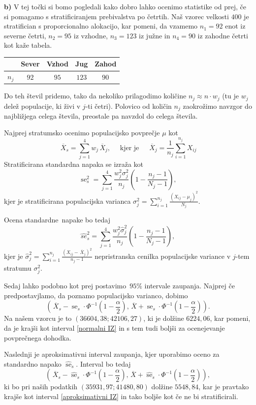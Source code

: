 \documentclass[a4paper,11pt]{article}
\newcommand{\olsi}[1]{\,\overline{\!{#1}}} %
\newcommand{\inv}{^{-1}}
\DeclareMathOperator{\se}{se}
\begin{document}
\noindent
\textbf{b)} V tej točki si bomo pogledali kako dobro lahko ocenimo statistike od prej, če si pomagamo s stratificiranjem prebivalstva po četrtih. Naš vzorec velkosti $400$ je stratifician s proporcionalno alokacijo, kar pomeni, da vzamemo $n_1 = 92$ enot iz severne četrti, $n_2 = 95$ iz vzhodne, $n_3 = 123$ iz južne in $n_4 = 90$ iz zahodne četrti kot kaže tabela.
\begin{center}
\begin{tabular}{|c || c c c c ||}
    \hline
    & Sever & Vzhod & Jug & Zahod \\
    \hline
    $n_j$ & $92$ & $95$ & $123$ & $90$ \\
    \hline 
\end{tabular}
\end{center}
Do teh števil pridemo, tako da nekoliko prilagodimo količine $n_j \approx n \cdot w_j$ (tu je $w_j$ delež populacije, ki živi v $j$-ti četri). Polovico od količin $n_j$ zaokrožimo navzgor do najbližjega celega števila, preostale pa navzdol do celega števila.

Najprej stratumsko ocenimo populacijsko povprečje $\mu$ kot
\[
    \olsi{X}_s = \sum_{j = 1}^4 w_j \olsi{X}_j, \quad \text{ kjer je } \quad \olsi{X}_j = \frac{1}{n_j}\sum_{i = 1}^{n_j} X_{ij}
\]
Stratificirana standardna napaka se izraža kot
\[
    \se^2_s = \sum_{j = 1}^4 \frac{w_j^2 \sigma_j^2}{n_j}\left(1 - \frac{n_j - 1}{N_j - 1}\right), 
\]
kjer je stratificirana populacijska varianca $\sigma_j^2 = \sum_{i = 1}^{n_j} \frac{(X_{ij} - \mu_j)^2}{N_j}$. 

Ocena standardne napake bo tedaj 
\[
    \hat{se}^2_s = \sum_{j = 1}^4 \frac{w_j^2 \hat{\sigma}_j^2}{n_j}\left(1 - \frac{n_j - 1}{N_j - 1}\right),
\] 
kjer je $\hat{\sigma}^2_j = \sum_{i = 1}^{n_j} \frac{(X_{ij} - \olsi{X}_j)^2}{n_j - 1}$ nepristranska cenilka populacijske variance v $j$-tem stratumu $\sigma_j^2$.

Sedaj lahko podobno kot prej postavimo $95\%$ intervale zaupanja. Najprej če predpostavjlamo, da poznamo populacijsko varianco, dobimo
\[
    \left(\olsi{X}_s - \se_s \cdot \Phi\inv\left(1 - \frac{\alpha}{2}\right), 
    \olsi{X} + \se_s \cdot \Phi\inv\left(1 - \frac{\alpha}{2}\right)\right).
\] 
Na našem vzorcu je to $\left(36604,38; 42106,27\right)$, ki je dolžine $6224,06$, kar pomeni, da je krajši kot interval \eqref{normalni IZ} in s tem tudi boljši za ocenejevanje povprečnega dohodka. 

Naslednji je aproksimativni interval zaupanja, kjer uporabimo oceno za standardno napako $\hat{\se}_s$. Interval bo tedaj 
\[
    \left(\olsi{X}_s - \hat{\se}_s \cdot \Phi\inv\left(1 - \frac{\alpha}{2}\right), 
    \olsi{X} + \hat{\se}_s \cdot \Phi\inv\left(1 - \frac{\alpha}{2}\right)\right), 
\]
ki bo pri naših podatkih $\left(35931,97; 41480,80\right)$ dolžine $5548,84$, kar je pravtako krajše kot interval \eqref{aproksimativni IZ} in tako boljše kot če ne bi stratificirali.
\end{document}
